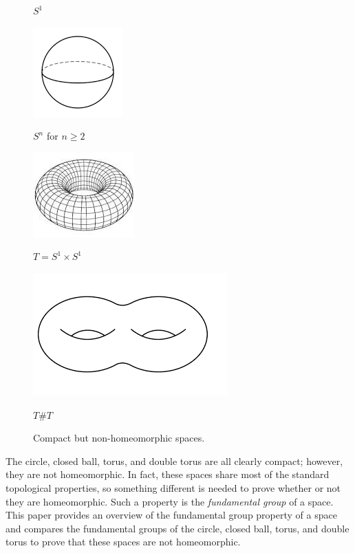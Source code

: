 \documentclass[letterpaper,12pt,fleqn]{article}
\begin{document}
\begin{figure}[H]
  \centering
  \begin{minipage}{3in}
    \centering

    \(S^1\)
  \end{minipage}
  \begin{minipage}{3in}
    \centering
    \includegraphics[scale=0.6]{sphere}

    \(S^n\) for \(n\ge2\)
  \end{minipage}

  \begin{minipage}{3in}
    \centering
    \includegraphics[scale=0.6]{torus}

    \(T=S^1\times S^1\)
  \end{minipage}
  \begin{minipage}{3in}
    \centering
    \includegraphics[scale=0.6]{dtorus}

    \(T\#T\)
  \end{minipage}
  \caption{Compact but non-homeomorphic spaces.}
  \label{fig:compact}
\end{figure}

The circle, closed ball, torus, and double torus are all clearly compact; however, they are not homeomorphic.  In
fact, these spaces share most of the standard topological properties, so something different is needed to prove
whether or not they are homeomorphic.  Such a property is the \emph{fundamental group} of a space.  This paper
provides an overview of the fundamental group property of a space and compares the fundamental groups of the
circle, closed ball, torus, and double torus to prove that these spaces are not homeomorphic.
\end{document}

